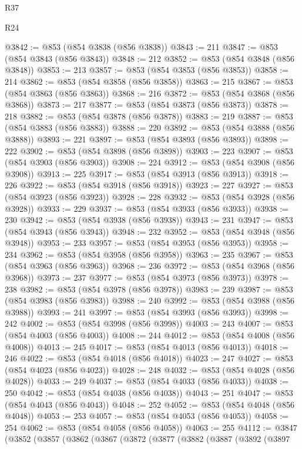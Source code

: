 \begin{lexlean}{R37}
\begin{lexlean}{R24}
\begin{coremodule}
{{{{{{{{{{{{{{{{{{{{{{{{{{{{{{{{{{{{{{{{{{{{{{{{{{{{{{{{{{{{{{{{{{{{{{{{{{{{{{{{{{{{{{{{{{{{{{{{{{{{{{{{{{{{{{{{{{{{{{{{{{{{{{{{{{{{{{{{{{{{{{{{{{{{{{{{{{{{{{{{{{{{{{{{{{{{{{{{{{{{{{{{{@3842 := @853 (@854 @3838 (@856 @3838))
@3843 := 211
@3847 := @853 (@854 @3843 (@856 @3843))
@3848 := 212
@3852 := @853 (@854 @3848 (@856 @3848))
@3853 := 213
@3857 := @853 (@854 @3853 (@856 @3853))
@3858 := 214
@3862 := @853 (@854 @3858 (@856 @3858))
@3863 := 215
@3867 := @853 (@854 @3863 (@856 @3863))
@3868 := 216
@3872 := @853 (@854 @3868 (@856 @3868))
@3873 := 217
@3877 := @853 (@854 @3873 (@856 @3873))
@3878 := 218
@3882 := @853 (@854 @3878 (@856 @3878))
@3883 := 219
@3887 := @853 (@854 @3883 (@856 @3883))
@3888 := 220
@3892 := @853 (@854 @3888 (@856 @3888))
@3893 := 221
@3897 := @853 (@854 @3893 (@856 @3893))
@3898 := 222
@3902 := @853 (@854 @3898 (@856 @3898))
@3903 := 223
@3907 := @853 (@854 @3903 (@856 @3903))
@3908 := 224
@3912 := @853 (@854 @3908 (@856 @3908))
@3913 := 225
@3917 := @853 (@854 @3913 (@856 @3913))
@3918 := 226
@3922 := @853 (@854 @3918 (@856 @3918))
@3923 := 227
@3927 := @853 (@854 @3923 (@856 @3923))
@3928 := 228
@3932 := @853 (@854 @3928 (@856 @3928))
@3933 := 229
@3937 := @853 (@854 @3933 (@856 @3933))
@3938 := 230
@3942 := @853 (@854 @3938 (@856 @3938))
@3943 := 231
@3947 := @853 (@854 @3943 (@856 @3943))
@3948 := 232
@3952 := @853 (@854 @3948 (@856 @3948))
@3953 := 233
@3957 := @853 (@854 @3953 (@856 @3953))
@3958 := 234
@3962 := @853 (@854 @3958 (@856 @3958))
@3963 := 235
@3967 := @853 (@854 @3963 (@856 @3963))
@3968 := 236
@3972 := @853 (@854 @3968 (@856 @3968))
@3973 := 237
@3977 := @853 (@854 @3973 (@856 @3973))
@3978 := 238
@3982 := @853 (@854 @3978 (@856 @3978))
@3983 := 239
@3987 := @853 (@854 @3983 (@856 @3983))
@3988 := 240
@3992 := @853 (@854 @3988 (@856 @3988))
@3993 := 241
@3997 := @853 (@854 @3993 (@856 @3993))
@3998 := 242
@4002 := @853 (@854 @3998 (@856 @3998))
@4003 := 243
@4007 := @853 (@854 @4003 (@856 @4003))
@4008 := 244
@4012 := @853 (@854 @4008 (@856 @4008))
@4013 := 245
@4017 := @853 (@854 @4013 (@856 @4013))
@4018 := 246
@4022 := @853 (@854 @4018 (@856 @4018))
@4023 := 247
@4027 := @853 (@854 @4023 (@856 @4023))
@4028 := 248
@4032 := @853 (@854 @4028 (@856 @4028))
@4033 := 249
@4037 := @853 (@854 @4033 (@856 @4033))
@4038 := 250
@4042 := @853 (@854 @4038 (@856 @4038))
@4043 := 251
@4047 := @853 (@854 @4043 (@856 @4043))
@4048 := 252
@4052 := @853 (@854 @4048 (@856 @4048))
@4053 := 253
@4057 := @853 (@854 @4053 (@856 @4053))
@4058 := 254
@4062 := @853 (@854 @4058 (@856 @4058))
@4063 := 255
@4112 := @3847
    (@3852
      (@3857
        (@3862
          (@3867
            (@3872
              (@3877
                (@3882
                  (@3887
                    (@3892
                      (@3897
}}}}}}}}}}}}}}}}}}}}}}}}}}}}}}}}}}}}}}}}}}}}}}}}}}}}}}}}}}}}}}}}}}}}}}}}}}}}}}}}}}}}}}}}}}}}}}}}}}}}}}}}}}}}}}}}}}}}}}}}}}}}}}}}}}}}}}}}}}}}}}}}}}}}}}}}}}}}}}}}}}}}}}}}}}}}}}}}}}}}}}}}}
\end{coremodule}
\end{lexlean}
\end{lexlean}
